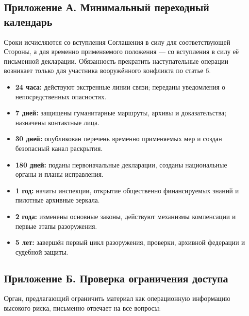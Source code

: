 \documentclass[
  russian,
  11pt,
  a4paper,
]{article}
\providecommand{\tightlist}{%
  \setlength{\itemsep}{0pt}\setlength{\parskip}{0pt}}
\begin{document}
\subsection{Приложение А. Минимальный переходный
календарь}\label{ux43fux440ux438ux43bux43eux436ux435ux43dux438ux435-ux430-ux43cux438ux43dux438ux43cux430ux43bux44cux43dux44bux439-ux43fux435ux440ux435ux445ux43eux434ux43dux44bux439-ux43aux430ux43bux435ux43dux434ux430ux440ux44c}

Сроки исчисляются со вступления Соглашения в силу для соответствующей
Стороны, а для временно применяемого положения --- со вступления в силу
её письменной декларации. Обязанность прекратить наступательные операции
возникает только для участника вооружённого конфликта по статье 6.

\begin{itemize}
\tightlist
\item
  \textbf{24 часа:} действуют экстренные линии связи; переданы
  уведомления о непосредственных опасностях.
\item
  \textbf{7 дней:} защищены гуманитарные маршруты, архивы и
  доказательства; назначены контактные лица.
\item
  \textbf{30 дней:} опубликован перечень временно применяемых мер и
  создан безопасный канал раскрытия.
\item
  \textbf{180 дней:} поданы первоначальные декларации, созданы
  национальные органы и планы исправления.
\item
  \textbf{1 год:} начаты инспекции, открытие общественно финансируемых
  знаний и пилотные архивные зеркала.
\item
  \textbf{2 года:} изменены основные законы, действуют механизмы
  компенсации и первые этапы разоружения.
\item
  \textbf{5 лет:} завершён первый цикл разоружения, проверки, архивной
  федерации и судебной защиты.
\end{itemize}

\subsection{Приложение Б. Проверка ограничения
доступа}\label{ux43fux440ux438ux43bux43eux436ux435ux43dux438ux435-ux431-ux43fux440ux43eux432ux435ux440ux43aux430-ux43eux433ux440ux430ux43dux438ux447ux435ux43dux438ux44f-ux434ux43eux441ux442ux443ux43fux430}

Орган, предлагающий ограничить материал как операционную информацию
высокого риска, письменно отвечает на все вопросы:
\end{document}
